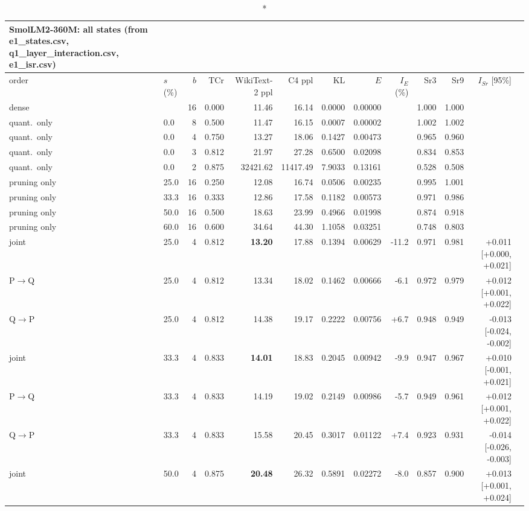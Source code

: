 \documentclass{article}
\begin{document}
\begin{longtable}{llrrrrrrrrrrl}
\caption*{\textbf{SmolLM2-360M}: all states (from e1\_states.csv, q1\_layer\_interaction.csv, e1\_isr.csv)}\\
\toprule order & $s$ (\%) & $b$ & TCr & WikiText-2 ppl & C4 ppl & KL & $E$ & $I_E$ (\%) & Sr3 & Sr9 & $I_{Sr}$ [95\%] \\ \midrule \endhead
dense &  & 16 & 0.000 & 11.46 & 16.14 & 0.0000 & 0.00000 &  & 1.000 & 1.000 &  \\
quant.\ only & 0.0 & 8 & 0.500 & 11.47 & 16.15 & 0.0007 & 0.00002 &  & 1.002 & 1.002 &  \\
quant.\ only & 0.0 & 4 & 0.750 & 13.27 & 18.06 & 0.1427 & 0.00473 &  & 0.965 & 0.960 &  \\
quant.\ only & 0.0 & 3 & 0.812 & 21.97 & 27.28 & 0.6500 & 0.02098 &  & 0.834 & 0.853 &  \\
quant.\ only & 0.0 & 2 & 0.875 & 32421.62 & 11417.49 & 7.9033 & 0.13161 &  & 0.528 & 0.508 &  \\
pruning only & 25.0 & 16 & 0.250 & 12.08 & 16.74 & 0.0506 & 0.00235 &  & 0.995 & 1.001 &  \\
pruning only & 33.3 & 16 & 0.333 & 12.86 & 17.58 & 0.1182 & 0.00573 &  & 0.971 & 0.986 &  \\
pruning only & 50.0 & 16 & 0.500 & 18.63 & 23.99 & 0.4966 & 0.01998 &  & 0.874 & 0.918 &  \\
pruning only & 60.0 & 16 & 0.600 & 34.64 & 44.30 & 1.1058 & 0.03251 &  & 0.748 & 0.803 &  \\
joint & 25.0 & 4 & 0.812 & \textbf{13.20} & 17.88 & 0.1394 & 0.00629 & -11.2 & 0.971 & 0.981 & +0.011 [+0.000, +0.021] \\
P$\to$Q & 25.0 & 4 & 0.812 & 13.34 & 18.02 & 0.1462 & 0.00666 & -6.1 & 0.972 & 0.979 & +0.012 [+0.001, +0.022] \\
Q$\to$P & 25.0 & 4 & 0.812 & 14.38 & 19.17 & 0.2222 & 0.00756 & +6.7 & 0.948 & 0.949 & -0.013 [-0.024, -0.002] \\
joint & 33.3 & 4 & 0.833 & \textbf{14.01} & 18.83 & 0.2045 & 0.00942 & -9.9 & 0.947 & 0.967 & +0.010 [-0.001, +0.021] \\
P$\to$Q & 33.3 & 4 & 0.833 & 14.19 & 19.02 & 0.2149 & 0.00986 & -5.7 & 0.949 & 0.961 & +0.012 [+0.001, +0.022] \\
Q$\to$P & 33.3 & 4 & 0.833 & 15.58 & 20.45 & 0.3017 & 0.01122 & +7.4 & 0.923 & 0.931 & -0.014 [-0.026, -0.003] \\
joint & 50.0 & 4 & 0.875 & \textbf{20.48} & 26.32 & 0.5891 & 0.02272 & -8.0 & 0.857 & 0.900 & +0.013 [+0.001, +0.024] \\

\end{longtable}
\end{document}
